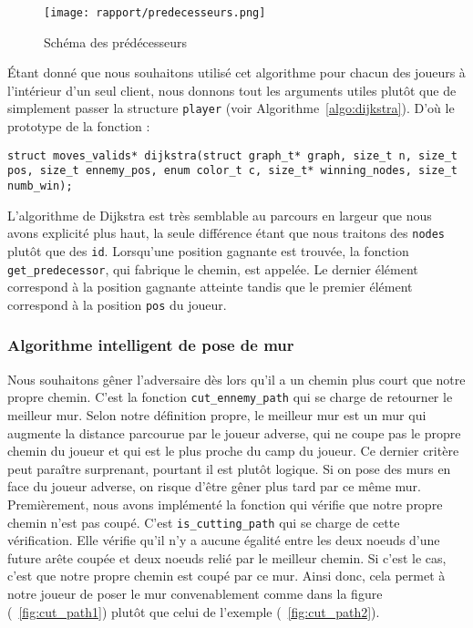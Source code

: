 \documentclass[a4paper]{article}
\begin{document}
\begin{figure}[ht]
    \centering
    \texttt{[image: rapport/predecesseurs.png]}
    \caption{Schéma des prédécesseurs}
    \label{fig:predecessor}
\end{figure}

Étant donné que nous souhaitons utilisé cet algorithme pour chacun des joueurs à l'intérieur d'un seul client, nous donnons tout les arguments utiles plutôt que de simplement passer la structure \texttt{player} (voir Algorithme~\ref{algo:dijkstra}). 
D'où le prototype de la fonction :

\begin{lstlisting}[caption = {Spécification de la fonction dijkstra}, label = {algo:dijkstra}, float = h]
struct moves_valids* dijkstra(struct graph_t* graph, size_t n, size_t pos, size_t ennemy_pos, enum color_t c, size_t* winning_nodes, size_t numb_win);
\end{lstlisting}

L'algorithme de Dijkstra est très semblable au parcours en largeur que nous avons explicité plus haut, la seule différence étant que nous traitons des \texttt{nodes} plutôt que des \texttt{id}. Lorsqu'une position gagnante est trouvée, la fonction \texttt{get\_predecessor}, qui fabrique le chemin, est appelée. Le dernier élément correspond à la position gagnante atteinte tandis que le premier élément correspond à la position \texttt{pos} du joueur. \\

\subsubsection{Algorithme intelligent de pose de mur}

Nous souhaitons gêner l'adversaire dès lors qu'il a un chemin plus court que notre propre chemin. C'est la fonction \texttt{cut\_ennemy\_path} qui se charge de retourner le meilleur mur. Selon notre définition propre, le meilleur mur est un mur qui augmente la distance parcourue par le joueur adverse, qui ne coupe pas le propre chemin du joueur et qui est le plus proche du camp du joueur. Ce dernier critère peut paraître surprenant, pourtant il est plutôt logique. Si on pose des murs en face du joueur adverse, on risque d'être gêner plus tard par ce même mur. \\

Premièrement, nous avons implémenté la fonction qui vérifie que notre propre chemin n'est pas coupé. C'est \texttt{is\_cutting\_path} qui se charge de cette vérification. Elle vérifie qu'il n'y a aucune égalité entre les deux noeuds d'une future arête coupée et deux noeuds relié par le meilleur chemin. Si c'est le cas, c'est que notre propre chemin est coupé par ce mur. Ainsi donc, cela permet à notre joueur de poser le mur convenablement comme dans la figure (~\ref{fig:cut_path1}) plutôt que celui de l'exemple (~\ref{fig:cut_path2}). \\
\end{document}
